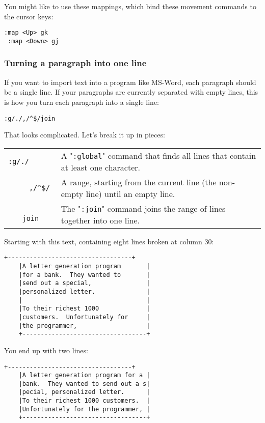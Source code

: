 You might like to use these mappings, which bind these movement commands to the cursor keys:

\begin{Verbatim}[samepage=true]
 :map <Up> gk
 :map <Down> gj
\end{Verbatim}
\subsubsection{Turning a paragraph into one line}
If you want to import text into a program like MS-Word, each paragraph should be a single line.
If your paragraphs are currently separated with empty lines, this is how you turn each paragraph into a single line:

\begin{Verbatim}[samepage=true]
 :g/./,/^$/join
\end{Verbatim}

That looks complicated.
Let's break it up in pieces:

\begin{center} \begin{tabular}{c l}
				\verb!:g/./         ! & A "\verb!:global!" command that finds all lines that contain at least one character. \\
				\verb!     ,/^$/    ! & A range, starting from the current line (the non-empty line) until an empty line. \\
				\verb!          join! & The "\verb!:join!" command joins the range of lines together into one line. \\
\end{tabular} \end{center}

Starting with this text, containing eight lines broken at column 30:

\begin{Verbatim}[samepage=true]
    +----------------------------------+
    |A letter generation program       |
    |for a bank.  They wanted to       |
    |send out a special,               |
    |personalized letter.              |
    |                                  |
    |To their richest 1000             |
    |customers.  Unfortunately for     |
    |the programmer,                   |
    +----------------------------------+
\end{Verbatim}

You end up with two lines:

\begin{Verbatim}[samepage=true]
    +----------------------------------+
    |A letter generation program for a |
    |bank.  They wanted to send out a s|
    |pecial, personalized letter.      |
    |To their richest 1000 customers.  |
    |Unfortunately for the programmer, |
    +----------------------------------+
\end{Verbatim}

